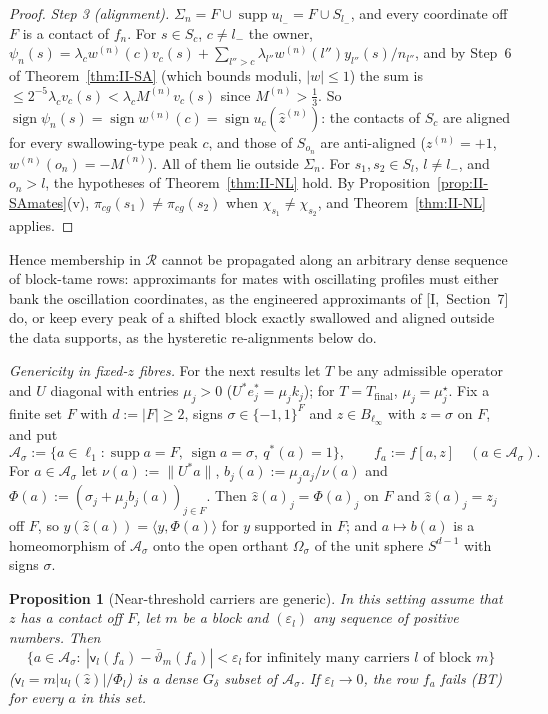 \documentclass[10pt]{amsart}
\newtheorem{proposition}[theorem]{Proposition}
\theoremstyle{definition}
\theoremstyle{remark}
\newcommand{\supp}{\operatorname{supp}}
\newcommand{\sgn}{\operatorname{sign}}
\newcommand{\Rec}{\mathcal R}
\newcommand{\zh}{\hat z}
\newcommand{\ip}[2]{\langle #1,#2\rangle}
\begin{document}
\begin{proof}
\emph{Step 3 (alignment).}  $\Sigma_n=F\cup\supp u_{l_-}=F\cup S_{l_-}$, and every
coordinate off $F$ is a contact of $f_n$.  For $s\in S_c$, $c\ne l_-$ the owner,
$\psi_n(s)=\lambda_cw^{(n)}(c)v_c(s)+\sum_{l''>c}\lambda_{l''}w^{(n)}(l'')y_{l''}(s)/
n_{l''}$, and by Step~6 of Theorem~\ref{thm:II-SA} (which bounds moduli,
$|w|\le1$) the sum is $\le2^{-5}\lambda_cv_c(s)<\lambda_cM^{(n)}v_c(s)$ since
$M^{(n)}>\frac13$.  So $\sgn\psi_n(s)=\sgn w^{(n)}(c)=\sgn u_c(\zh^{(n)})$: the
contacts of $S_c$ are aligned for every swallowing-type peak $c$, and those
of $S_{o_n}$ are anti-aligned ($z^{(n)}=+1$, $w^{(n)}(o_n)=-M^{(n)}$).  All of
them lie outside $\Sigma_n$.  For $s_1,s_2\in S_l$, $l\ne l_-$, and $o_n>l$, the
hypotheses of Theorem~\ref{thm:II-NL} hold.  By
Proposition~\ref{prop:II-SAmates}(v), $\pi_{cg}(s_1)\ne\pi_{cg}(s_2)$ when
$\chi_{s_1}\ne\chi_{s_2}$, and Theorem~\ref{thm:II-NL} applies.
\end{proof}

Hence membership in $\Rec$ cannot be propagated along an arbitrary dense
sequence of block-tame rows: approximants for mates with oscillating
profiles must either bank the oscillation coordinates, as the engineered
approximants of [I,~Section~7] do, or keep every peak of a shifted block
exactly swallowed and aligned outside the data supports, as the hysteretic
re-alignments below do.

\smallskip\noindent\emph{Genericity in fixed-$z$ fibres.}  For the next
results let $T$ be any admissible operator and $U$ diagonal with entries
$\mu_j>0$ ($U^*e_j^*=\mu_jk_j$); for $T=T_{\mathrm{final}}$, $\mu_j=\mu^\star_j$.  Fix a
finite set $F$ with $d:=|F|\ge2$, signs $\sigma\in\{-1,1\}^F$ and $z\in
B_{\ell_\infty}$ with $z=\sigma$ on $F$, and put
\[
 \mathcal A_\sigma:=\{a\in\ell_1:\supp a=F,\ \sgn a=\sigma,\ q^*(a)=1\},\qquad
 f_a:=f[a,z]\quad(a\in\mathcal A_\sigma).
\]
For $a\in\mathcal A_\sigma$ let $\nu(a):=\|U^*a\|$, $b_j(a):=\mu_ja_j/\nu(a)$ and
$\Phi(a):=(\sigma_j+\mu_jb_j(a))_{j\in F}$.  Then $\zh(a)_j=\Phi(a)_j$ on $F$ and
$\zh(a)_j=z_j$ off $F$, so $y(\zh(a))=\ip y{\Phi(a)}$ for $y$ supported in $F$;
and $a\mapsto b(a)$ is a homeomorphism of $\mathcal A_\sigma$ onto the open
orthant $\Omega_\sigma$ of the unit sphere $S^{d-1}$ with signs $\sigma$.

\begin{proposition}[Near-threshold carriers are generic]\label{prop:II-Baire}
In this setting assume that $z$ has a contact off $F$, let $m$ be a block
and $(\varepsilon_l)$ any sequence of positive numbers.  Then
\[
 \{a\in\mathcal A_\sigma:\ |\mathsf v_l(f_a)-\bar\vartheta_m(f_a)|<\varepsilon_l\
 \text{for infinitely many carriers $l$ of block }m\}
\]
\textup{(}$\mathsf v_l=m|u_l(\zh)|/\Phi_l$\textup{)} is a dense $G_\delta$ subset
of $\mathcal A_\sigma$.  If $\varepsilon_l\to0$, the row $f_a$ fails
\textup{(BT)} for every $a$ in this set.
\end{proposition}
\end{document}
